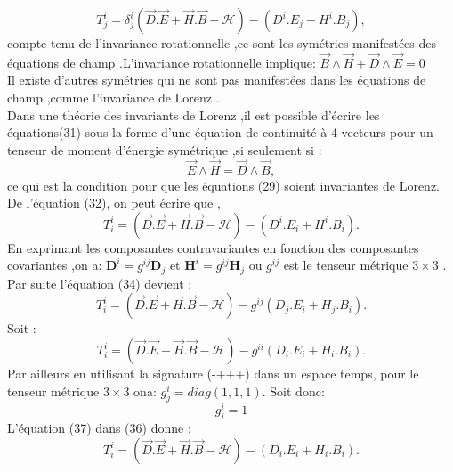 \documentclass[12pt,a4paper, openany]{article}
\begin{document}
\begin{equation}
	T_j^i=\delta^i_j(\vec{D}.\vec{E}+\vec{H}.\vec{B}-\mathcal{H})-({D}^i.{E}_j+{H}^i.{B}_j), 
\end{equation} 
compte tenu de l'invariance rotationnelle ,ce sont les symétries manifestées des équations de champ .L'invariance rotationnelle implique: $\vec{B}\wedge\vec{H} +\vec{D}\wedge\vec{E}=0 $ \\
\hspace{0.5cm}Il existe d'autres symétries qui ne sont pas manifestées dans les équations de champ ,comme l'invariance de Lorenz .\\
Dans une théorie des invariants de Lorenz ,il est possible d'écrire les équations(31) sous la forme d'une équation de continuité à 4 vecteurs  pour un tenseur de moment d'énergie symétrique ,si seulement si :
\begin{equation}
 \vec{E}\wedge\vec{H}=\vec{D}\wedge\vec{B},
\end{equation}
ce qui est la condition pour que les équations (29) soient invariantes de Lorenz.\\
De l'équation (32), on peut écrire que ,\\
\begin{equation}
	T_i^i=(\vec{D}.\vec{E}+\vec{H}.\vec{B}-\mathcal{H})-\left({D}^i.{E}_i+{H}^i.{B}_i\right). 
\end{equation}
 En exprimant les composantes contravariantes en fonction des composantes covariantes ,on a:
 $\textbf{D}^i=g^{ij}\textbf{D}_j$ et $\textbf{H}^i=g^{ij}\textbf{H}_j$ ou $g^{ij}$ est le tenseur métrique $3\times3$ .\\
 Par suite l'équation (34) devient :
 \begin{equation}
 		T_i^i=(\vec{D}.\vec{E}+\vec{H}.\vec{B}-\mathcal{H})-g^{ij}({D}_j.{E}_i+{H}_j.{B}_i). 
 	 \end{equation}
 	 Soit :
 	 \begin{equation}
 	 	T_i^i=(\vec{D}.\vec{E}+\vec{H}.\vec{B}-\mathcal{H})-g^{ii}({D}_i.{E}_i+{H}_i.{B}_i). 
 	 \end{equation}
 	 Par ailleurs en utilisant la signature (-\;+\;+\;+) dans un espace temps, pour le tenseur métrique $3\times3$ ona: $ g_j^{i} =diag(1,1,1)$. Soit donc:
 	 \begin{equation}
 	 	 g_i^{i}=1
 	 \end{equation}
 	 L'équation (37) dans (36) donne :
 	 \begin{equation}
 	 	T_i^i=(\vec{D}.\vec{E}+\vec{H}.\vec{B}-\mathcal{H})-({D}_i.{E}_i+{H}_i.{B}_i). 
 	 \end{equation}
\end{document}
